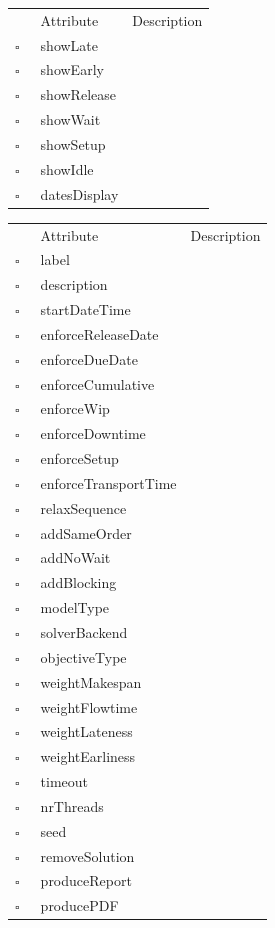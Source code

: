 \clearpage
\begin{table}
\caption{AbstractGanttProperty  }

\begin{longtable}{llp{8cm}}
& Attribute & Description \\
$\square$\ & showLate &  \\
$\square$\ & showEarly &  \\
$\square$\ & showRelease &  \\
$\square$\ & showWait &  \\
$\square$\ & showSetup &  \\
$\square$\ & showIdle &  \\
$\square$\ & datesDisplay &  \\
\end{longtable}
\label{attr:AbstractGanttProperty}
\end{table}

\begin{table}
\caption{AbstractSolverProperty  }

\begin{longtable}{llp{8cm}}
& Attribute & Description \\
$\square$\ & label &  \\
$\square$\ & description &  \\
$\square$\ & startDateTime &  \\
$\square$\ & enforceReleaseDate &  \\
$\square$\ & enforceDueDate &  \\
$\square$\ & enforceCumulative &  \\
$\square$\ & enforceWip &  \\
$\square$\ & enforceDowntime &  \\
$\square$\ & enforceSetup &  \\
$\square$\ & enforceTransportTime &  \\
$\square$\ & relaxSequence &  \\
$\square$\ & addSameOrder &  \\
$\square$\ & addNoWait &  \\
$\square$\ & addBlocking &  \\
$\square$\ & modelType &  \\
$\square$\ & solverBackend &  \\
$\square$\ & objectiveType &  \\
$\square$\ & weightMakespan &  \\
$\square$\ & weightFlowtime &  \\
$\square$\ & weightLateness &  \\
$\square$\ & weightEarliness &  \\
$\square$\ & timeout &  \\
$\square$\ & nrThreads &  \\
$\square$\ & seed &  \\
$\square$\ & removeSolution &  \\
$\square$\ & produceReport &  \\
$\square$\ & producePDF &  \\
\end{longtable}
\label{attr:AbstractSolverProperty}
\end{table}

